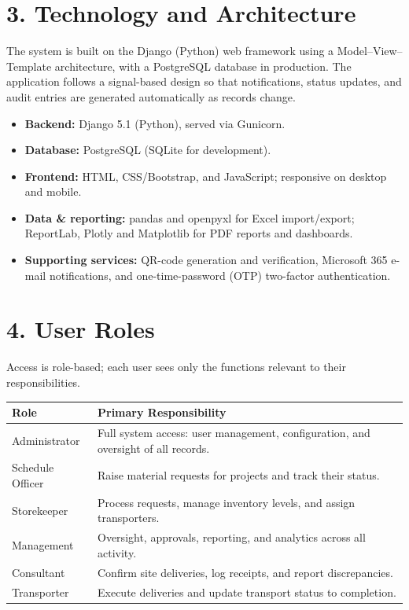 \documentclass[11pt,a4paper]{article}
\begin{document}
\section{3. Technology and Architecture}
The system is built on the Django (Python) web framework using a Model–View–Template
architecture, with a PostgreSQL database in production. The application follows a
signal-based design so that notifications, status updates, and audit entries are
generated automatically as records change.

\begin{itemize}
  \item \textbf{Backend:} Django 5.1 (Python), served via Gunicorn.
  \item \textbf{Database:} PostgreSQL (SQLite for development).
  \item \textbf{Frontend:} HTML, CSS/Bootstrap, and JavaScript; responsive on desktop and mobile.
  \item \textbf{Data \& reporting:} pandas and openpyxl for Excel import/export; ReportLab, Plotly and Matplotlib for PDF reports and dashboards.
  \item \textbf{Supporting services:} QR-code generation and verification, Microsoft 365 e-mail notifications, and one-time-password (OTP) two-factor authentication.
\end{itemize}

\section{4. User Roles}
Access is role-based; each user sees only the functions relevant to their
responsibilities.

\begin{table}[h]
\centering
\small
\begin{tabular}{@{}p{3.2cm}p{11cm}@{}}
\toprule
\textbf{Role} & \textbf{Primary Responsibility} \\
\midrule
Administrator & Full system access: user management, configuration, and oversight of all records. \\
Schedule Officer & Raise material requests for projects and track their status. \\
Storekeeper & Process requests, manage inventory levels, and assign transporters. \\
Management & Oversight, approvals, reporting, and analytics across all activity. \\
Consultant & Confirm site deliveries, log receipts, and report discrepancies. \\
Transporter & Execute deliveries and update transport status to completion. \\
\bottomrule
\end{tabular}
\end{table}
\end{document}
